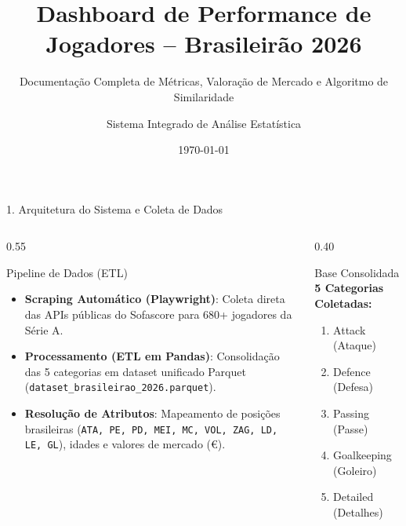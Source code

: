 \documentclass[aspectratio=169, 10pt]{beamer}
\title[Dashboard Brasileirão 2026]{Dashboard de Performance de Jogadores -- Brasileirão 2026}
\subtitle{Documentação Completa de Métricas, Valoração de Mercado e Algoritmo de Similaridade}
\author[AnaliseJogador]{Sistema Integrado de Análise Estatística}
\institute[Brasileirão Analytics]{Brasileirão Analytics Betano 2026}
\date{\today}
\begin{document}
\begin{frame}
  \titlepage
\end{frame}

\begin{frame}{1. Arquitetura do Sistema e Coleta de Dados}
  \begin{columns}
    \begin{column}{0.55\textwidth}
      \begin{block}{Pipeline de Dados (ETL)}
        \begin{itemize}
          \item \textbf{Scraping Automático (Playwright)}: Coleta direta das APIs públicas do Sofascore para 680+ jogadores da Série A.
          \item \textbf{Processamento (ETL em Pandas)}: Consolidação das 5 categorias em dataset unificado Parquet (\texttt{dataset\_brasileirao\_2026.parquet}).
          \item \textbf{Resolução de Atributos}: Mapeamento de posições brasileiras (\texttt{ATA, PE, PD, MEI, MC, VOL, ZAG, LD, LE, GL}), idades e valores de mercado (€).
        \end{itemize}
      \end{block}
    \end{column}
    \begin{column}{0.40\textwidth}
      \begin{alertblock}{Base Consolidada}
        \centering
        \textbf{5 Categorias Coletadas:}
        \begin{enumerate}
          \item Attack (Ataque)
          \item Defence (Defesa)
          \item Passing (Passe)
          \item Goalkeeping (Goleiro)
          \item Detailed (Detalhes)
        \end{enumerate}
      \end{alertblock}
    \end{column}
  \end{columns}
\end{frame}
\end{document}
